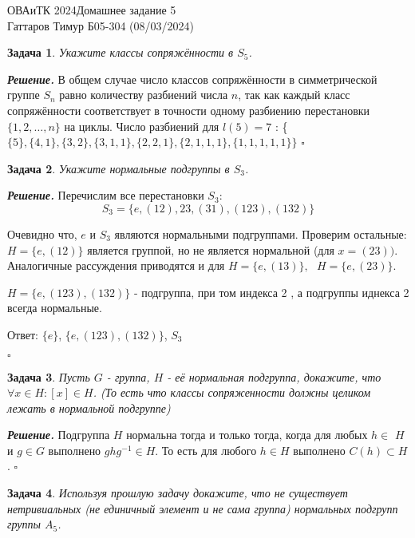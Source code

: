 \documentclass[12pt]{article}
\newtheorem{problem}{Задача}
\newenvironment{solution}[1][\it{Решение}]{\textbf{#1. } }{$\square$}
\begin{document}
\noindent ОВАиТК 2024\hfill Домашнее задание 5 \\
Гаттаров Тимур Б05-304 (08/03/2024)

\hrulefill

\begin{problem}
    Укажите классы сопряжённости в $S_5$.
\end{problem}

\begin{solution}
    В общем случае число классов сопряжённости в симметрической группе $S_n$ равно количеству разбиений числа $n$, так как каждый класс сопряжённости соответствует в точности одному разбиению перестановки $\{1,2, \ldots, n\}$ на циклы.
    Число разбиений для $l(5) = 7$ : \{$\{5\}, \{4, 1\}, \{3, 2\}, \{3, 1, 1\}, \{2, 2, 1\}, \{2, 1, 1, 1\}, \{1, 1, 1, 1, 1\}\}$
\end{solution}
\begin{problem}
    Укажите нормальные подгруппы в $S_3$.
\end{problem}

\begin{solution}
    Перечислим все перестановки $S_3$:
    $$
    S_3 = \{e, (12), {23}, (31), (123), (132)\}
    $$

    Очевидно что, $e$ и $S_3$ являются нормальными подгруппами. Проверим остальные: $H=\{e,(12)\}$ является группой, но не является нормальной (для $x=(23))$. Аналогичные рассуждения приводятся и для $H=\{e,(13)\}, \text{ } H = \{e,(23)\}$.
    
    $H=\{e,(123),(132)\}$ - подгруппа, при том индекса 2 , а подгруппы иднекса 2 всегда нормальные.


    Ответ: $\{e\}$, $\{e,(123),(132)\}$, $S_3$
    
\end{solution}

\begin{problem}
    Пусть $G$ - группа, $H$ - её нормальная подгруппа, докажите, что $\forall x \in H:[x] \in H$. (То есть что классы сопряженности должны целиком лежать в нормальной подгруппе)
\end{problem}

\begin{solution}
    Подгруппа $H$ нормальна тогда и только тогда, когда для любых $h \in$ $H$ и $g \in G$ выполнено $g h g^{-1} \in H$. То есть для любого $h \in H$ выполнено $C(h) \subset H$.
\end{solution}

\begin{problem}
    Используя прошлую задачу докажите, что не существует нетривиальных (не единичный элемент и не сама группа) нормальных подгрупп группы $A_5$.
\end{problem}
\end{document}
